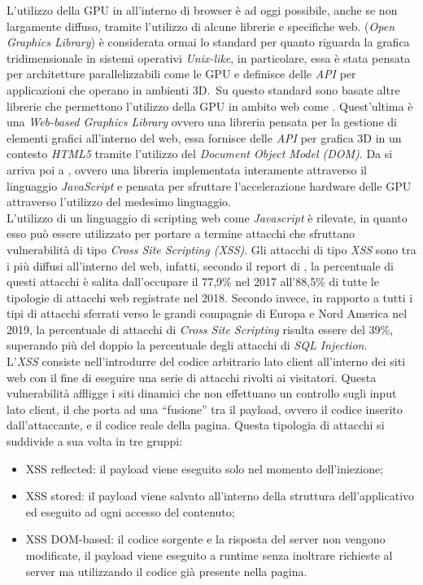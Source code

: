 \documentclass[conference, italian]{IEEEtran}
\newcommand\citen[1]{\citeauthor{#1} \citep{#1}}
\begin{document}
L'utilizzo della GPU in all'interno di browser è ad oggi possibile, anche se non largamente diffuso, tramite l'utilizzo di alcune librerie e specifiche web.  (\emph{Open Graphics Library}) è considerata ormai lo standard per quanto riguarda la grafica tridimensionale in sistemi operativi \emph{Unix-like}, in particolare, essa è stata pensata per architetture parallelizzabili come le GPU e definisce delle \emph{API} per applicazioni che operano in ambienti 3D.\ Su questo standard sono basate altre librerie che permettono l'utilizzo della GPU in ambito web come . Quest'ultima è una \emph{Web-based Graphics Library} ovvero una libreria pensata per la gestione di elementi grafici all'interno del web, essa fornisce delle \emph{API} per grafica 3D in un contesto \emph{HTML5} tramite l'utilizzo del \emph{Document Object Model (DOM)}. Da  si arriva poi a , ovvero una libreria implementata interamente attraverso il linguaggio \emph{JavaScript} e pensata per sfruttare l'accelerazione hardware delle GPU attraverso l'utilizzo del medesimo linguaggio.\\
L'utilizzo di un linguaggio di scripting web come \emph{Javascript} è rilevate, in quanto esso può essere utilizzato per portare a termine attacchi che sfruttano vulnerabilità di tipo \emph{Cross Site Scripting (XSS)}. Gli attacchi di tipo \emph{XSS} sono tra i più diffusi all'interno del web, infatti, secondo il report di \citen{PositiveTechnologiesReport}, la percentuale di questi attacchi è salita dall'occupare il 77,9\% nel 2017 all'88,5\% di tutte le tipologie di attacchi web registrate nel 2018. Secondo \citen{PreciseSecurityReport} invece, in rapporto a tutti i tipi di attacchi sferrati verso le grandi compagnie di Europa e Nord America nel 2019, la percentuale di attacchi di \emph{Cross Site Scripting} risulta essere del 39\%, superando più del doppio la percentuale degli attacchi di \emph{SQL Injection}.\\
L'\emph{XSS} consiste nell’introdurre del codice arbitrario lato client all'interno dei siti web con il fine di eseguire una serie di attacchi rivolti ai visitatori. Questa vulnerabilità affligge i siti dinamici che non effettuano un controllo sugli input lato client, il che porta ad una ``fusione'' tra il payload, ovvero il codice inserito dall'attaccante, e il codice reale della pagina. Questa tipologia di attacchi si suddivide a sua volta in tre gruppi:
\begin{itemize}
  \item XSS reflected: il payload viene eseguito solo nel momento dell’iniezione;
  \item XSS stored: il payload viene salvato all'interno della struttura dell'applicativo ed eseguito ad ogni accesso del contenuto;
  \item XSS DOM-based: il codice sorgente e la risposta del server non vengono modificate, il payload viene eseguito a runtime senza inoltrare richieste al server ma utilizzando il codice già presente nella pagina.
\end{itemize}
\end{document}
